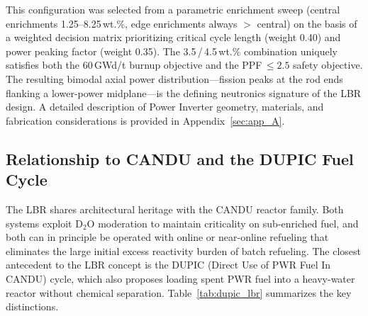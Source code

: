 This configuration was selected from a parametric enrichment sweep (central
enrichments 1.25--8.25\,wt.\%, edge enrichments always $>$ central) on the
basis of a weighted decision matrix prioritizing critical cycle length
(weight 0.40) and power peaking factor (weight 0.35). The 3.5\,/\,4.5\,wt.\%
combination uniquely satisfies both the 60\,GWd/t burnup objective and the
PPF\,$\leq 2.5$ safety objective. The resulting bimodal axial power
distribution---fission peaks at the rod ends flanking a lower-power
midplane---is the defining neutronics signature of the LBR design. A detailed
description of Power Inverter geometry, materials, and fabrication
considerations is provided in Appendix~\ref{sec:app_A}.

\subsection{Relationship to CANDU and the DUPIC Fuel Cycle}

The LBR shares architectural heritage with the CANDU reactor family. Both
systems exploit D$_2$O moderation to maintain criticality on sub-enriched
fuel, and both can in principle be operated with online or near-online
refueling that eliminates the large initial excess reactivity burden of batch
refueling. The closest antecedent to the LBR concept is the DUPIC (Direct Use
of PWR Fuel In CANDU) cycle, which also proposes loading spent PWR fuel into
a heavy-water reactor without chemical separation. Table~\ref{tab:dupic_lbr}
summarizes the key distinctions.

